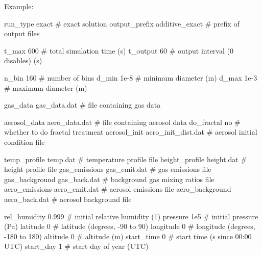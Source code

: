 Example\+: 
\begin{DoxyPre}
 run\_type exact                  \# exact solution
 output\_prefix additive\_exact    \# prefix of output files\end{DoxyPre}



\begin{DoxyPre} t\_max 600                       \# total simulation time (s)
 t\_output 60                     \# output interval (0 disables) (s)\end{DoxyPre}



\begin{DoxyPre} n\_bin 160                       \# number of bins
 d\_min 1e-8                      \# minimum diameter (m)
 d\_max 1e-3                      \# maximum diameter (m)\end{DoxyPre}



\begin{DoxyPre} gas\_data gas\_data.dat           \# file containing gas data\end{DoxyPre}



\begin{DoxyPre} aerosol\_data aero\_data.dat      \# file containing aerosol data
 do\_fractal no                   \# whether to do fractal treatment
 aerosol\_init aero\_init\_dist.dat \# aerosol initial condition file\end{DoxyPre}



\begin{DoxyPre} temp\_profile temp.dat           \# temperature profile file
 height\_profile height.dat       \# height profile file
 gas\_emissions gas\_emit.dat      \# gas emissions file
 gas\_background gas\_back.dat     \# background gas mixing ratios file
 aero\_emissions aero\_emit.dat    \# aerosol emissions file
 aero\_background aero\_back.dat   \# aerosol background file\end{DoxyPre}



\begin{DoxyPre} rel\_humidity 0.999              \# initial relative humidity (1)
 pressure 1e5                    \# initial pressure (Pa)
 latitude 0                      \# latitude (degrees, -90 to 90)
 longitude 0                     \# longitude (degrees, -180 to 180)
 altitude 0                      \# altitude (m)
 start\_time 0                    \# start time (s since 00:00 UTC)
 start\_day 1                     \# start day of year (UTC)\end{DoxyPre}




